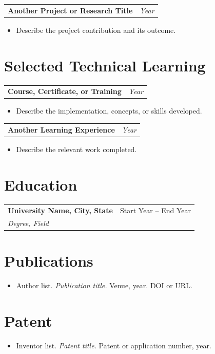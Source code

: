 \documentclass[10pt,letterpaper]{article}
\makeatletter
\newcommand{\heading}[2]{\vspace{2pt}\begin{tabularx}{\textwidth}{@{}Xr@{}}\textbf{#1} & \textit{#2}\end{tabularx}\vspace{-0pt}}
\newcommand{\headingwtitle}[3]{\vspace{2pt}\begin{tabularx}{\textwidth}{@{}Xr@{}}\textbf{#1} & #3\\[1pt] \textit{#2} & \end{tabularx}\vspace{-0pt}}
\makeatother
\begin{document}
\heading{Another Project or Research Title}{Year}
\begin{itemize}
\item Describe the project contribution and its outcome.
\end{itemize}

\section*{Selected Technical Learning}
\heading{Course, Certificate, or Training}{Year}
\begin{itemize}
\item Describe the implementation, concepts, or skills developed.
\end{itemize}

\heading{Another Learning Experience}{Year}
\begin{itemize}
\item Describe the relevant work completed.
\end{itemize}

\section*{Education}
\headingwtitle{University Name, City, State}{Degree, Field}{Start Year -- End Year}

\section*{Publications}
\begin{itemize}
\item Author list. \textit{Publication title.} Venue, year. DOI or URL.
\end{itemize}

\section*{Patent}
\begin{itemize}
\item Inventor list. \textit{Patent title.} Patent or application number, year.
\end{itemize}
\end{document}
